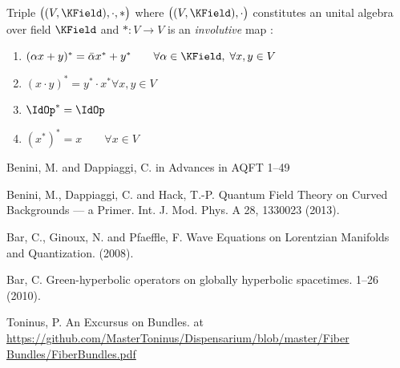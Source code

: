 \documentclass[a4paper,12pt]{scrartcl}    %
\begin{document}
			\begin{definition}
				Triple $\big( (V,\KField), \cdot, *\big)$ where $\big((V,\KField), \cdot\big)$ constitutes an unital algebra over field $\KField$ and $*:V\rightarrow V$ is an \emph{involutive} map :
				\begin{enumerate}
					\item $ (\alpha x + y)^* = \bar{\alpha} x^* + y^* \qquad \forall \alpha \in \KField, \; \forall x,y \in V$
					\item $(x \cdot y)^* = y^* \cdot x^* \forall x,y \in V$
					\item $\IdOp^* = \IdOp$
					\item $ (x^*)^* = x \qquad \forall x \in V$
				\end{enumerate}	
			\end{definition}

		
\newpage
\begin{thebibliography}{100}

 Benini, M. and Dappiaggi, C. in Advances in AQFT 1–49

 Benini, M., Dappiaggi, C. and Hack, T.-P. Quantum Field Theory on Curved Backgrounds — a Primer. Int. J. Mod. Phys. A 28, 1330023 (2013).

 Bar, C., Ginoux, N. and Pfaeffle, F. Wave Equations on Lorentzian Manifolds and Quantization. (2008).

  Bar, C. Green-hyperbolic operators on globally hyperbolic spacetimes. 1–26 (2010).


  Toninus, P. An Excursus on Bundles. at \url{https://github.com/MasterToninus/Dispensarium/blob/master/Fiber Bundles/FiberBundles.pdf}

\end{thebibliography}		
\end{document}
